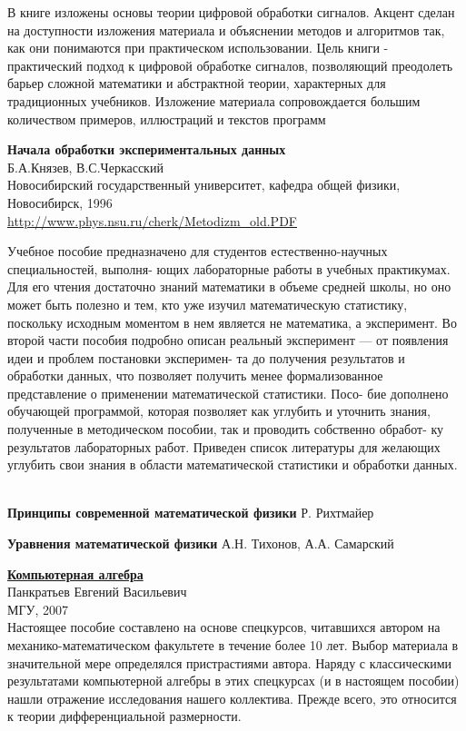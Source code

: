 \begin{thebibliography}{99}
В книге изложены основы теории цифровой обработки сигналов. Акцент сделан на
доступности изложения материала и объяснении методов и алгоритмов так, как они
понимаются при практическом использовании. Цель книги - практический подход к
цифровой обработке сигналов, позволяющий преодолеть барьер сложной математики и
абстрактной теории, характерных для традиционных учебников. Изложение материала
сопровождается большим количеством примеров, иллюстраций и текстов программ

\textbf{Начала обработки экспериментальных данных}\\
Б.А.Князев, В.С.Черкасский\\
Новосибирский государственный университет, кафедра общей физики,
Новосибирск, 1996\\
\url{http://www.phys.nsu.ru/cherk/Metodizm_old.PDF}

Учебное пособие предназначено для студентов естественно-научных специальностей,
выполня- ющих лабораторные работы в учебных практикумах. Для его чтения
достаточно знаний математики в объеме средней школы, но оно может быть полезно и
тем, кто уже изучил математическую статистику, поскольку исходным моментом в нем
является не математика, а эксперимент. Во второй части пособия подробно описан
реальный эксперимент — от появления идеи и проблем постановки эксперимен- та до
получения результатов и обработки данных, что позволяет получить менее
формализованное представление о применении математической статистики. Посо- бие
дополнено обучающей программой, которая позволяет как углубить и уточнить
знания, полученные в методическом пособии, так и проводить собственно обработ-
ку результатов лабораторных работ. Приведен список литературы для желающих
углубить свои знания в области математической статистики и обработки данных.

\ \\
\textbf{Принципы современной математической физики}
Р. Рихтмайер

\textbf{Уравнения математической физики}
А.Н. Тихонов, А.А. Самарский


\href{https://drive.google.com/file/d/0B0u4WeMjO894bGQ1SC1PYnBGUG8/view?usp=sharing}{\textbf{Компьютерная алгебра}}\\
Панкратьев Евгений Васильевич\\
МГУ, 2007\\
Настоящее пособие составлено на основе спецкурсов, читавшихся автором на
механико-математическом факультете в течение более 10 лет. Выбор материала в
значительной мере определялся пристрастиями автора. Наряду с классическими
результатами компьютерной алгебры в этих спецкурсах (и в настоящем пособии)
нашли отражение исследования нашего коллектива. Прежде всего, это относится к
теории дифференциальной размерности.


\end{thebibliography}
